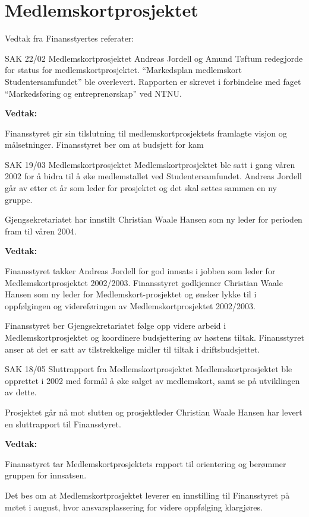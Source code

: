 \chapter*{Medlemskortprosjektet}

Vedtak fra Finansstyertes referater:


\begin{instruksledd}{SAK 22/02 Medlemskortprosjektet}
    Andreas Jordell og Amund Tøftum redegjorde for status for medlemskortprosjektet.
    ``Markedsplan medlemskort
    Studentersamfundet'' ble overlevert. Rapporten er skrevet i forbindelse med faget
    ``Markedsføring og entreprenørskap''
    ved NTNU.
    
    \textbf{Vedtak:}

    Finansstyret gir sin tilslutning til medlemskortprosjektets framlagte visjon og
    målsetninger. Finansstyret ber om at
    budsjett for kam

\end{instruksledd}

\begin{instruksledd}{SAK 19/03 Medlemskortprosjektet}
    Medlemskortprosjektet ble satt i gang våren 2002 for å bidra til å øke medlemstallet
    ved Studentersamfundet. Andreas
    Jordell går av etter et år som leder for prosjektet og det skal settes sammen en ny
    gruppe.
    
    Gjengsekretariatet har innstilt Christian Waale Hansen som ny leder for perioden fram
    til våren 2004.
    
    \textbf{Vedtak:}

    Finansstyret takker Andreas Jordell for god innsats i jobben som leder for
    Medlemskortprosjektet 2002/2003.
    Finansstyret godkjenner Christian Waale Hansen som ny leder for Medlemskort-prosjektet
    og ønsker lykke til i
    oppfølgingen og videreføringen av Medlemskortprosjektet 2002/2003.
    
    Finansstyret ber Gjengsekretariatet følge opp videre arbeid i Medlemskortprosjektet og
    koordinere budsjettering av
    høstens tiltak. Finansstyret anser at det er satt av tilstrekkelige midler til tiltak
    i driftsbudsjettet.


\end{instruksledd}


\begin{instruksledd}{SAK 18/05 Sluttrapport fra Medlemskortprosjektet}
    Medlemskortprosjektet ble opprettet i 2002 med formål å øke salget av medlemskort,
    samt se på utviklingen av dette.

    Prosjektet går nå mot slutten og prosjektleder Christian Waale Hansen har levert en
    sluttrapport til Finansstyret.
    
    \textbf{Vedtak:}

    Finansstyret tar Medlemskortprosjektets rapport til orientering og berømmer gruppen
    for innsatsen.
    
    Det bes om at Medlemskortprosjektet leverer en innstilling til Finansstyret på møtet i
    august, hvor ansvarsplassering
    for videre oppfølging klargjøres.
\end{instruksledd}


